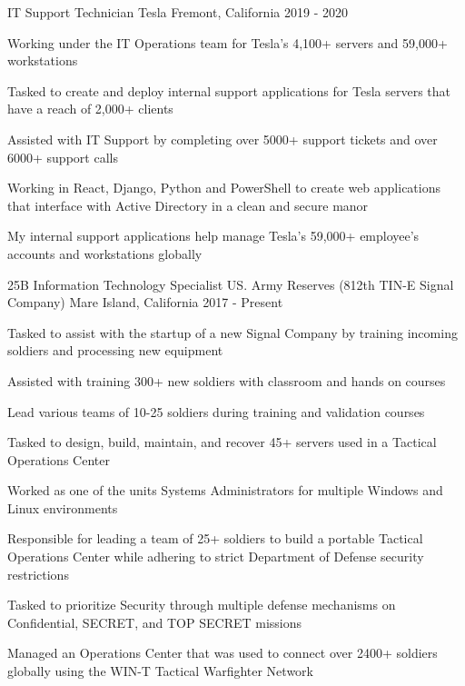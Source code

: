 \begin{cventries}
  \cventry
    {IT Support Technician} %
    {Tesla} %
    {Fremont, California} %
    {2019 - 2020} %
    {
      \begin{cvitems} %
        \item {Working under the IT Operations team for Tesla’s 4,100+ servers and 59,000+ workstations}
        \item{Tasked to create and deploy internal support applications for Tesla servers that have a reach of 2,000+ clients}
        \item {Assisted with IT Support by completing over 5000+ support tickets and over 6000+ support calls}
        \item{Working in React, Django, Python and PowerShell to create web applications that interface with Active Directory in a clean and secure manor}
        \item{My internal support applications help manage Tesla's 59,000+ employee's accounts and workstations globally}
      \end{cvitems}
    }

  \cventry
    {25B Information Technology Specialist} %
    {US. Army Reserves (812th TIN-E Signal Company)} %
    {Mare Island, California} %
    {2017 - Present} %
    {
      \begin{cvitems} %
        \item {Tasked to assist with the startup of a new Signal Company by training incoming soldiers and processing new equipment}
        \item {Assisted with training 300+ new soldiers with classroom and hands on courses}
        \item {Lead various teams of 10-25 soldiers during training and validation courses}
        \item {Tasked to design, build, maintain, and recover 45+ servers used in a Tactical Operations Center}
        \item {Worked as one of the units Systems Administrators for multiple Windows and Linux environments}
        \item {Responsible for leading a team of 25+ soldiers to build a portable Tactical Operations Center while adhering to strict Department of Defense security restrictions}
        \item {Tasked to prioritize Security through multiple defense mechanisms on Confidential, SECRET, and TOP SECRET missions}
        \item {Managed an Operations Center that was used to connect over 2400+ soldiers globally using the WIN-T Tactical Warfighter Network}
      \end{cvitems}
    }

\end{cventries}
